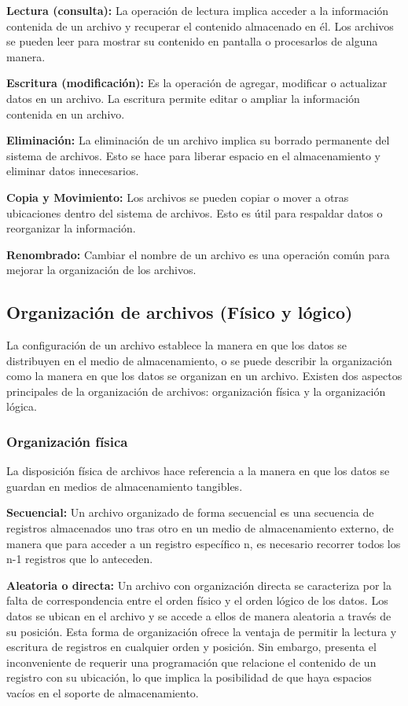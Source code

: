 \documentclass[11pt, twocolumn]{article}
\begin{document}
  \textbf{Lectura (consulta):} La operación de lectura implica acceder a la información contenida de un archivo y recuperar el contenido almacenado en él. Los archivos se pueden leer para mostrar su contenido en pantalla o procesarlos de alguna manera.

  \textbf{Escritura (modificación):} Es la operación de agregar, modificar o actualizar datos en un archivo. La escritura permite editar o ampliar la información contenida en un archivo.

  \textbf{Eliminación:} La eliminación de un archivo implica su borrado permanente del sistema de archivos. Esto se hace para liberar espacio en el almacenamiento y eliminar datos innecesarios.

  \textbf{Copia y Movimiento:} Los archivos se pueden copiar o mover a otras ubicaciones dentro del sistema de archivos. Esto es útil para respaldar datos o reorganizar la información.

  \textbf{Renombrado:} Cambiar el nombre de un archivo es una operación común para mejorar la organización de los archivos.

  \subsection{Organización de archivos (Físico y lógico)}
  La configuración de un archivo establece la manera en que los datos se distribuyen en el medio de almacenamiento, o se puede describir la organización como la manera en que los datos se organizan en un archivo. Existen dos aspectos principales de la organización de archivos: organización física y la organización lógica.

  \subsubsection*{Organización física}
  La disposición física de archivos hace referencia a la manera en que los datos se guardan en medios de almacenamiento tangibles.

  \textbf{Secuencial:} Un archivo organizado de forma secuencial es una secuencia de registros almacenados uno tras otro en un medio de almacenamiento externo, de manera que para acceder a un registro específico n, es necesario recorrer todos los n-1 registros que lo anteceden.

  \textbf{Aleatoria o directa:} Un archivo con organización directa se caracteriza por la falta de correspondencia entre el orden físico y el orden lógico de los datos. Los datos se ubican en el archivo y se accede a ellos de manera aleatoria a través de su posición. Esta forma de organización ofrece la ventaja de permitir la lectura y escritura de registros en cualquier orden y posición. Sin embargo, presenta el inconveniente de requerir una programación que relacione el contenido de un registro con su ubicación, lo que implica la posibilidad de que haya espacios vacíos en el soporte de almacenamiento.
\end{document}
